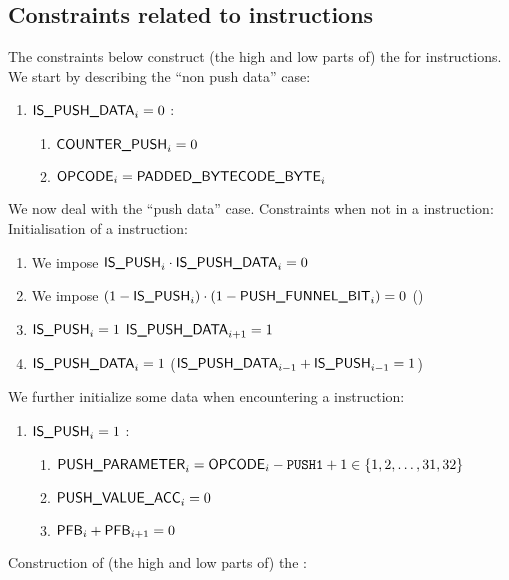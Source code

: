 \subsection{Constraints related to  instructions}

The constraints below construct (the high and low parts of) the \PV{} for  instructions. We start by describing the ``non push data'' case: %
\begin{enumerate}
    \item \If $\textsf{IS\_PUSH\_DATA}_{i}=0$ \Then:
        \begin{enumerate}
            \item $\textsf{COUNTER\_PUSH}_{i}=0$
            \item $\textsf{OPCODE}_{i}=\textsf{PADDED\_BYTECODE\_BYTE}_{i}$
        \end{enumerate}
\end{enumerate}
We now deal with the ``push data'' case.
Constraints when not in a  instruction:
Initialisation of a  instruction: 
\begin{enumerate}[resume]
    \item We impose $\textsf{IS\_PUSH}_{i} \cdot \textsf{IS\_PUSH\_DATA}_{i} = 0$
    \item We impose $(1 - \textsf{IS\_PUSH}_{i}) \cdot (1 - \textsf{PUSH\_FUNNEL\_BIT}_{i}) = 0$ \quad (\trash)
    \item \If $\textsf{IS\_PUSH}_{i}=1$ \Then $\textsf{IS\_PUSH\_DATA}_{i + 1}=1$
    \item \If $\textsf{IS\_PUSH\_DATA}_{i}=1$ \Then \Big($\textsf{IS\_PUSH\_DATA}_{i-1} + \textsf{IS\_PUSH}_{i-1} = 1$\Big)
\end{enumerate}
We further initialize some data when encountering a  instruction:
\begin{enumerate}[resume]
    \item \If $\textsf{IS\_PUSH}_{i}=1$ \Then:
        \begin{enumerate}
            \item $\textsf{PUSH\_PARAMETER}_{i} = \textsf{OPCODE}_{i} - \texttt{PUSH1} + 1 \in \{ 1, 2, \dots, 31, 32 \}$
            \item $\textsf{PUSH\_VALUE\_ACC}_{i}=0$
            \item $\textsf{PFB}_{i} + \textsf{PFB}_{i + 1} = 0$
        \end{enumerate}
\end{enumerate}
Construction of (the high and low parts of) the \PV{}:
